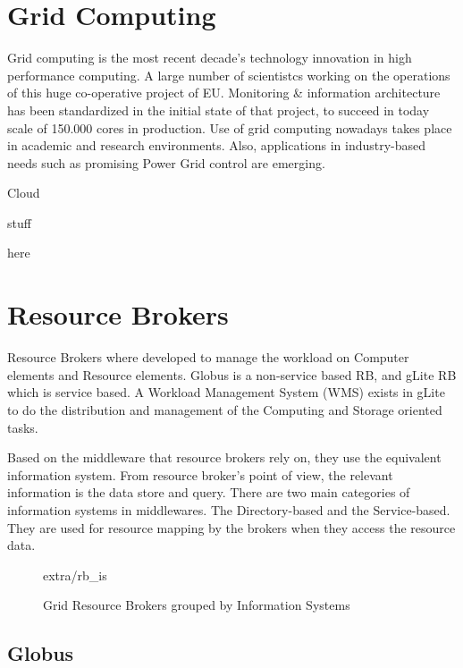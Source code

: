 \section{Grid Computing}
Grid computing \cite{li2005grid} is the most recent decade's technology
innovation in high performance computing. A large number of scientistcs working
on the operations of this huge co-operative project of EU. Monitoring \&
information architecture \cite{fisher2002datagrid} has been standardized in the
initial state of that project, to succeed in today scale of 150.000 cores in
production. Use of grid computing nowadays takes place in academic and research
environments. Also, applications in industry-based needs such as promising
Power Grid control \cite{Taylor2006} are emerging.


Cloud

stuff

here

\section{Resource Brokers}
Resource Brokers \cite{Kertesz06ataxonomy} where developed to manage the
workload on Computer elements and Resource elements. Globus is a
non-service based RB, and gLite RB which is service based. A Workload
Management System (WMS) exists in gLite to do the distribution and management of
the Computing and Storage oriented tasks.

Based on the middleware that resource brokers rely on, they use the
equivalent information system. From resource broker's point of view, the
relevant information is the data store and query. There are two main categories
of information systems in middlewares. The Directory-based and the
Service-based. They are used for resource mapping by the brokers when they
access the resource data.

\begin{figure}
\begin{center}
 {extra/rb_is}
\caption{Grid Resource Brokers grouped by Information
Systems\cite{Kertesz06ataxonomy}}
\end{center}
\end{figure}

\subsection{Globus}

